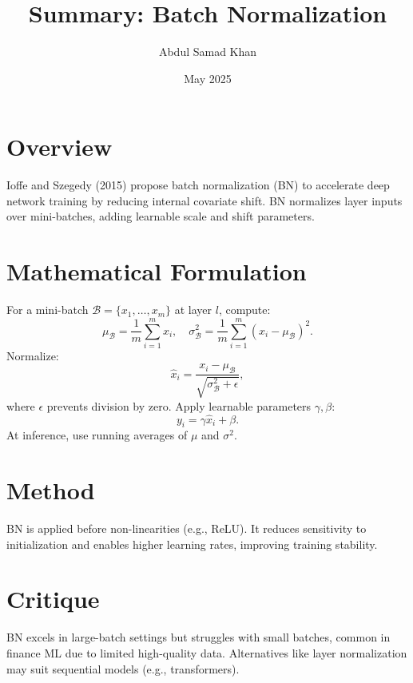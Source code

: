 \documentclass{article}
\begin{document}
\title{Summary: Batch Normalization}
\author{Abdul Samad Khan}
\date{May 2025}
\maketitle

\section{Overview}
Ioffe and Szegedy (2015) propose batch normalization (BN) to accelerate deep network training by reducing internal covariate shift. BN normalizes layer inputs over mini-batches, adding learnable scale and shift parameters.

\section{Mathematical Formulation}
For a mini-batch $\mathcal{B} = \{x_1, \dots, x_m\}$ at layer $l$, compute:
\[
\mu_\mathcal{B} = \frac{1}{m} \sum_{i=1}^m x_i, \quad \sigma_\mathcal{B}^2 = \frac{1}{m} \sum_{i=1}^m (x_i - \mu_\mathcal{B})^2.
\]
Normalize:
\[
\hat{x}_i = \frac{x_i - \mu_\mathcal{B}}{\sqrt{\sigma_\mathcal{B}^2 + \epsilon}},
\]
where $\epsilon$ prevents division by zero. Apply learnable parameters $\gamma, \beta$:
\[
y_i = \gamma \hat{x}_i + \beta.
\]
At inference, use running averages of $\mu$ and $\sigma^2$.

\section{Method}
BN is applied before non-linearities (e.g., ReLU). It reduces sensitivity to initialization and enables higher learning rates, improving training stability.

\section{Critique}
BN excels in large-batch settings but struggles with small batches, common in finance ML due to limited high-quality data. Alternatives like layer normalization may suit sequential models (e.g., transformers).
\end{document}
